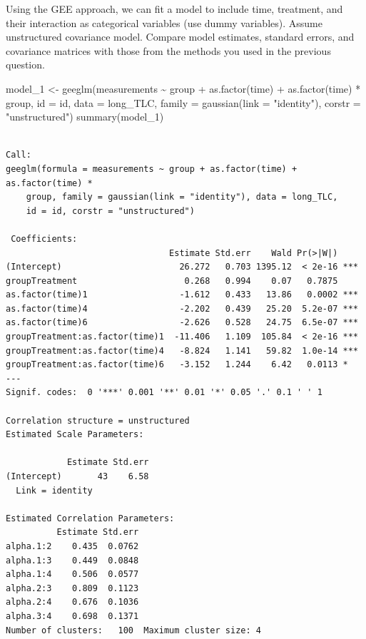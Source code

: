 \documentclass[
  letterpaper,
  DIV=11,
  numbers=noendperiod]{scrreprt}
\newenvironment{Shaded}{\begin{snugshade}}{\end{snugshade}}
\newcommand{\AttributeTok}[1]{\textcolor[rgb]{0.40,0.45,0.13}{#1}}
\newcommand{\FunctionTok}[1]{\textcolor[rgb]{0.28,0.35,0.67}{#1}}
\newcommand{\NormalTok}[1]{\textcolor[rgb]{0.00,0.23,0.31}{#1}}
\newcommand{\OtherTok}[1]{\textcolor[rgb]{0.00,0.23,0.31}{#1}}
\newcommand{\SpecialCharTok}[1]{\textcolor[rgb]{0.37,0.37,0.37}{#1}}
\newcommand{\StringTok}[1]{\textcolor[rgb]{0.13,0.47,0.30}{#1}}
\begin{document}
Using the GEE approach, we can fit a model to include time, treatment,
and their interaction as categorical variables (use dummy variables).
Assume unstructured covariance model. Compare model estimates, standard
errors, and covariance matrices with those from the methods you used in
the previous question.

\begin{Shaded}
\begin{Highlighting}[]
\NormalTok{model\_1 }\OtherTok{\textless{}{-}} \FunctionTok{geeglm}\NormalTok{(measurements }\SpecialCharTok{\textasciitilde{}}\NormalTok{ group }\SpecialCharTok{+} \FunctionTok{as.factor}\NormalTok{(time) }\SpecialCharTok{+} \FunctionTok{as.factor}\NormalTok{(time) }\SpecialCharTok{*}\NormalTok{ group,}
    \AttributeTok{id =}\NormalTok{ id, }\AttributeTok{data =}\NormalTok{ long\_TLC, }\AttributeTok{family =} \FunctionTok{gaussian}\NormalTok{(}\AttributeTok{link =} \StringTok{"identity"}\NormalTok{), }\AttributeTok{corstr =} \StringTok{"unstructured"}\NormalTok{)}
\FunctionTok{summary}\NormalTok{(model\_1)}
\end{Highlighting}
\end{Shaded}

\begin{verbatim}

Call:
geeglm(formula = measurements ~ group + as.factor(time) + as.factor(time) * 
    group, family = gaussian(link = "identity"), data = long_TLC, 
    id = id, corstr = "unstructured")

 Coefficients:
                                Estimate Std.err    Wald Pr(>|W|)    
(Intercept)                       26.272   0.703 1395.12  < 2e-16 ***
groupTreatment                     0.268   0.994    0.07   0.7875    
as.factor(time)1                  -1.612   0.433   13.86   0.0002 ***
as.factor(time)4                  -2.202   0.439   25.20  5.2e-07 ***
as.factor(time)6                  -2.626   0.528   24.75  6.5e-07 ***
groupTreatment:as.factor(time)1  -11.406   1.109  105.84  < 2e-16 ***
groupTreatment:as.factor(time)4   -8.824   1.141   59.82  1.0e-14 ***
groupTreatment:as.factor(time)6   -3.152   1.244    6.42   0.0113 *  
---
Signif. codes:  0 '***' 0.001 '**' 0.01 '*' 0.05 '.' 0.1 ' ' 1

Correlation structure = unstructured 
Estimated Scale Parameters:

            Estimate Std.err
(Intercept)       43    6.58
  Link = identity 

Estimated Correlation Parameters:
          Estimate Std.err
alpha.1:2    0.435  0.0762
alpha.1:3    0.449  0.0848
alpha.1:4    0.506  0.0577
alpha.2:3    0.809  0.1123
alpha.2:4    0.676  0.1036
alpha.3:4    0.698  0.1371
Number of clusters:   100  Maximum cluster size: 4 
\end{verbatim}
\end{document}
